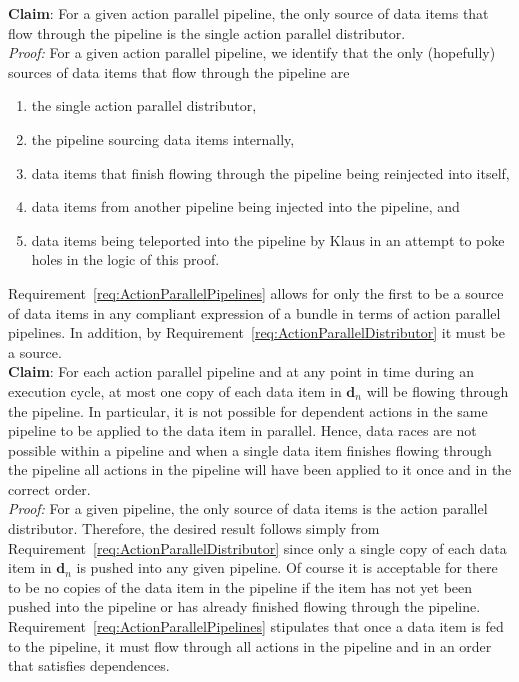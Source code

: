 \documentclass{article}
\begin{document}
\textbf{Claim}: For a given action parallel pipeline, the only source of data
items that flow through the pipeline is the single action parallel distributor.\\[0.05in]
\textit{Proof:}\hspace{0.125in}  For a given action parallel pipeline, we
identify that the only (hopefully) sources of data items that flow through the
pipeline are
\begin{enumerate}
\item{the single action parallel distributor,}
\item{the pipeline sourcing data items internally,}
\item{data items that finish flowing through the pipeline being reinjected into
itself,}
\item{data items from another pipeline being injected into the pipeline, and}
\item{data items being teleported into the pipeline by Klaus in an attempt to poke
holes in the logic of this proof.}
\end{enumerate}
Requirement~\ref{req:ActionParallelPipelines} allows for only the first to be a
source of data items in any compliant expression of a bundle in terms of action
parallel pipelines.  In addition, by
Requirement~\ref{req:ActionParallelDistributor} it must be a source.\\

\textbf{Claim}: For each action parallel pipeline and at any point in time during
an execution cycle, at most one copy of each data item in $\mathbf{d}_n$ will be
flowing through the pipeline.  In particular, it is not possible for dependent
actions in the same pipeline to be applied to the data item in parallel.  Hence,
data races are not possible within a pipeline and when a single data item
finishes flowing through the pipeline all actions in the pipeline will have been
applied to it once and in the correct order.\\[0.05in]
\textit{Proof:}\hspace{0.125in}  For a given pipeline, the only source of data
items is the action parallel distributor.  Therefore, the desired result follows
simply from Requirement~\ref{req:ActionParallelDistributor} since only a single
copy of each data item in $\mathbf{d}_n$ is pushed into any given pipeline.  Of
course it is acceptable for there to be no copies of the data item in the
pipeline if the item has not yet been pushed into the pipeline or has already
finished flowing through the pipeline.
Requirement~\ref{req:ActionParallelPipelines} stipulates that once a data item
is fed to the pipeline, it must flow through all actions in the pipeline and in
an order that satisfies dependences.\\
\end{document}
